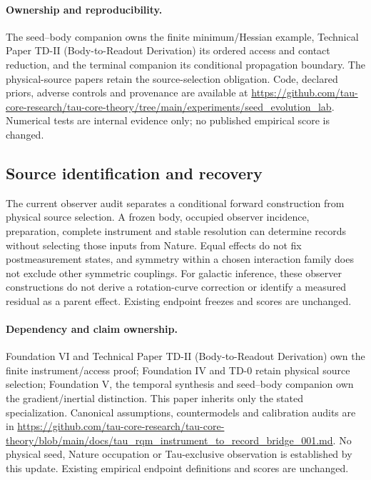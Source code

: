 \documentclass[11pt]{article}
\begin{document}
\paragraph{Ownership and reproducibility.}
The seed--body companion owns the finite minimum/Hessian example, Technical Paper TD-II (Body-to-Readout Derivation) its ordered access and contact reduction, and the terminal companion its conditional propagation boundary. The physical-source papers retain the source-selection obligation. Code, declared priors, adverse controls and provenance are available at \url{https://github.com/tau-core-research/tau-core-theory/tree/main/experiments/seed_evolution_lab}. Numerical tests are internal evidence only; no published empirical score is changed.

\subsection{Source identification and recovery}
The current observer audit separates a conditional forward construction from physical source selection. A frozen body, occupied observer incidence, preparation, complete instrument and stable resolution can determine records without selecting those inputs from Nature. Equal effects do not fix postmeasurement states, and symmetry within a chosen interaction family does not exclude other symmetric couplings. For galactic inference, these observer constructions do not derive a rotation-curve correction or identify a measured residual as a parent effect. Existing endpoint freezes and scores are unchanged.

\paragraph{Dependency and claim ownership.}
Foundation VI and Technical Paper TD-II (Body-to-Readout Derivation) own the finite instrument/access proof; Foundation IV and TD-0 retain physical source selection; Foundation V, the temporal synthesis and seed--body companion own the gradient/inertial distinction. This paper inherits only the stated specialization. Canonical assumptions, countermodels and calibration audits are in \url{https://github.com/tau-core-research/tau-core-theory/blob/main/docs/tau_rqm_instrument_to_record_bridge_001.md}. No physical seed, Nature occupation or Tau-exclusive observation is established by this update. Existing empirical endpoint definitions and scores are unchanged.
\end{document}
